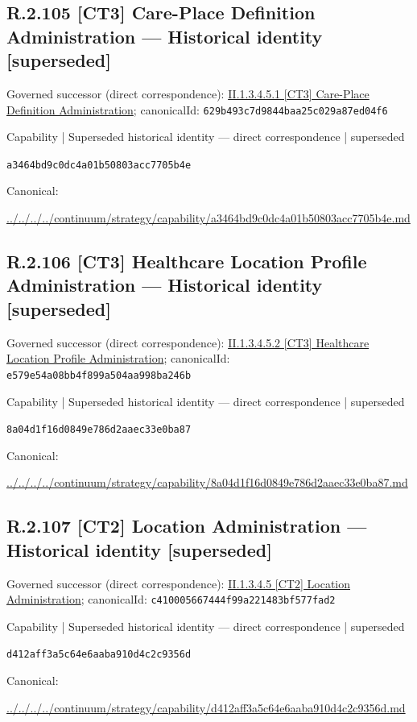 \documentclass[10pt,a4paper]{article}
\begin{document}
\subsection*{R.2.105 [CT3] Care-Place Definition Administration — Historical identity [superseded]}
Governed successor (direct correspondence): \hyperref[element-629b493c7d9844baa25c029a87ed04f6]{II.1.3.4.5.1 [CT3] Care-Place Definition Administration}; canonicalId: \texttt{629b493c7d9844baa25c029a87ed04f6}\par
\label{element-a3464bd9c0dc4a01b50803acc7705b4e}
{\small Capability | Superseded historical identity — direct correspondence | superseded}\par
\texttt{a3464bd9c0dc4a01b50803acc7705b4e}\par
Canonical: \par
{\footnotesize\url{../../../../continuum/strategy/capability/a3464bd9c0dc4a01b50803acc7705b4e.md}}\par
\subsection*{R.2.106 [CT3] Healthcare Location Profile Administration — Historical identity [superseded]}
Governed successor (direct correspondence): \hyperref[element-e579e54a08bb4f899a504aa998ba246b]{II.1.3.4.5.2 [CT3] Healthcare Location Profile Administration}; canonicalId: \texttt{e579e54a08bb4f899a504aa998ba246b}\par
\label{element-8a04d1f16d0849e786d2aaec33e0ba87}
{\small Capability | Superseded historical identity — direct correspondence | superseded}\par
\texttt{8a04d1f16d0849e786d2aaec33e0ba87}\par
Canonical: \par
{\footnotesize\url{../../../../continuum/strategy/capability/8a04d1f16d0849e786d2aaec33e0ba87.md}}\par
\subsection*{R.2.107 [CT2] Location Administration — Historical identity [superseded]}
Governed successor (direct correspondence): \hyperref[element-c410005667444f99a221483bf577fad2]{II.1.3.4.5 [CT2] Location Administration}; canonicalId: \texttt{c410005667444f99a221483bf577fad2}\par
\label{element-d412aff3a5c64e6aaba910d4c2c9356d}
{\small Capability | Superseded historical identity — direct correspondence | superseded}\par
\texttt{d412aff3a5c64e6aaba910d4c2c9356d}\par
Canonical: \par
{\footnotesize\url{../../../../continuum/strategy/capability/d412aff3a5c64e6aaba910d4c2c9356d.md}}\par
\end{document}
